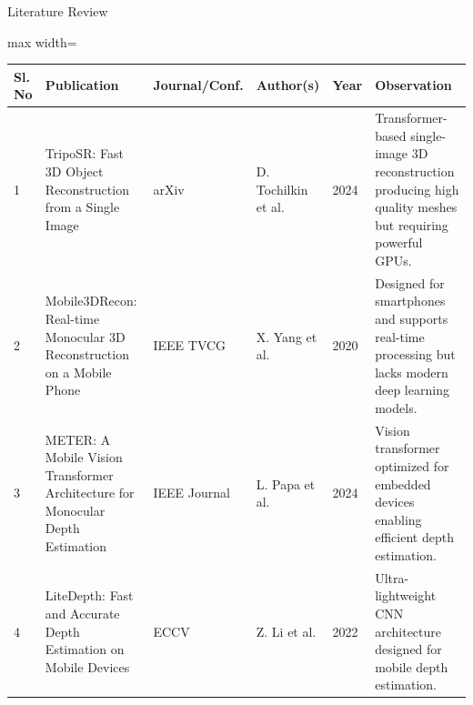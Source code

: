 \documentclass[11pt]{beamer}
\begin{document}
\begin{frame}[allowframebreaks]{Literature Review}
\small

\begin{adjustbox}{max width=\textwidth}
\begin{tabular}{|p{0.8cm}|p{3.5cm}|p{2.5cm}|p{3cm}|p{1.5cm}|p{4cm}|}
\hline
\textbf{Sl. No} &
\textbf{Publication} &
\textbf{Journal/Conf.} &
\textbf{Author(s)} &
\textbf{Year} &
\textbf{Observation} \\
\hline

1 & TripoSR: Fast 3D Object Reconstruction from a Single Image &
arXiv &
D. Tochilkin et al. &
2024 &
Transformer-based single-image 3D reconstruction producing high quality meshes but requiring powerful GPUs. \\
\hline

2 & Mobile3DRecon: Real-time Monocular 3D Reconstruction on a Mobile Phone &
IEEE TVCG &
X. Yang et al. &
2020 &
Designed for smartphones and supports real-time processing but lacks modern deep learning models. \\
\hline

3 & METER: A Mobile Vision Transformer Architecture for Monocular Depth Estimation &
IEEE Journal &
L. Papa et al. &
2024 &
Vision transformer optimized for embedded devices enabling efficient depth estimation. \\
\hline

4 & LiteDepth: Fast and Accurate Depth Estimation on Mobile Devices &
ECCV &
Z. Li et al. &
2022 &
Ultra-lightweight CNN architecture designed for mobile depth estimation. \\
\hline

\end{tabular}
\end{adjustbox}

\end{frame}
\end{document}
